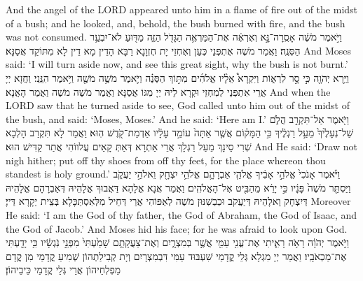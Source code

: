 {{And the angel of the LORD appeared unto him in a flame of fire out of the midst of a bush; and he looked, and, behold, the bush burned with fire, and the bush was not consumed.}{}
{וַיֹּ֣אמֶר מֹשֶׁ֔ה אָסֻֽרָה־נָּ֣א וְאֶרְאֶ֔ה אֶת־הַמַּרְאֶ֥ה הַגָּדֹ֖ל הַזֶּ֑ה מַדּ֖וּעַ לֹא־יִבְעַ֥ר הַסְּנֶֽה׃
}
{וַאֲמַר מֹשֶׁה אֶתְפְּנֵי כְּעַן וְאֶחְזֵי יָת חֶזְוָנָא רַבָּא הָדֵין מָא דֵין לָא מִתּוֹקַד אֲסַנָּא׃}
{And Moses said: ‘I will turn aside now, and see this great sight, why the bush is not burnt.’}{}
{וַיַּ֥רְא יְהֹוָ֖ה כִּ֣י סָ֣ר לִרְא֑וֹת וַיִּקְרָא֩ אֵלָ֨יו אֱלֹהִ֜ים מִתּ֣וֹךְ הַסְּנֶ֗ה וַיֹּ֛אמֶר מֹשֶׁ֥ה מֹשֶׁ֖ה וַיֹּ֥אמֶר הִנֵּֽנִי׃}
{וַחֲזָא יְיָ אֲרֵי אִתְפְּנֵי לְמִחְזֵי וּקְרָא לֵיהּ יְיָ מִגּוֹ אֲסַנָּא וַאֲמַר מֹשֶׁה מֹשֶׁה וַאֲמַר הָאֲנָא׃}
{And when the LORD saw that he turned aside to see, God called unto him out of the midst of the bush, and said: ‘Moses, Moses.’ And he said: ‘Here am I.’}{}
{וַיֹּ֖אמֶר אַל־תִּקְרַ֣ב הֲלֹ֑ם שַׁל־נְעָלֶ֙יךָ֙ מֵעַ֣ל רַגְלֶ֔יךָ כִּ֣י הַמָּק֗וֹם אֲשֶׁ֤ר אַתָּה֙ עוֹמֵ֣ד עָלָ֔יו אַדְמַת־קֹ֖דֶשׁ הֽוּא׃
}
{וַאֲמַר לָא תִּקְרַב הָלְכָא שְׁרִי סֵינָךְ מֵעַל רַגְלָךְ אֲרֵי אַתְרָא דְּאַתְּ קָאֵים עֲלווֹהִי אֲתַר קַדִּישׁ הוּא׃}
{And He said: ‘Draw not nigh hither; put off thy shoes from off thy feet, for the place whereon thou standest is holy ground.’}{}
{וַיֹּ֗אמֶר אָנֹכִי֙ אֱלֹהֵ֣י אָבִ֔יךָ אֱלֹהֵ֧י אַבְרָהָ֛ם אֱלֹהֵ֥י יִצְחָ֖ק וֵאלֹהֵ֣י יַעֲקֹ֑ב וַיַּסְתֵּ֤ר מֹשֶׁה֙ פָּנָ֔יו כִּ֣י יָרֵ֔א מֵהַבִּ֖יט אֶל־הָאֱלֹהִֽים׃}
{וַאֲמַר אֲנָא אֱלָהָא דַּאֲבוּךְ אֱלָהֵיהּ דְּאַבְרָהָם אֱלָהֵיהּ דְּיִצְחָק וֵאלָהֵיהּ דְּיַעֲקֹב וּכְבַשִׁנּוּן מֹשֶׁה לְאַפּוֹהִי אֲרֵי דְּחֵיל מִלְּאִסְתַּכָּלָא בְּצֵית יְקָרָא דַּייָ׃}
{Moreover He said: ‘I am the God of thy father, the God of Abraham, the God of Isaac, and the God of Jacob.’ And Moses hid his face; for he was afraid to look upon God.}{}
{וַיֹּ֣אמֶר יְהֹוָ֔ה רָאֹ֥ה רָאִ֛יתִי אֶת־עֳנִ֥י עַמִּ֖י אֲשֶׁ֣ר בְּמִצְרָ֑יִם וְאֶת־צַעֲקָתָ֤ם שָׁמַ֙עְתִּי֙ מִפְּנֵ֣י נֹֽגְשָׂ֔יו כִּ֥י יָדַ֖עְתִּי אֶת־מַכְאֹבָֽיו׃
}
{וַאֲמַר יְיָ מִגְלָא גְּלֵי קֳדָמַי שִׁעְבּוּד עַמִּי דִּבְמִצְרָיִם וְיָת קְבִילַתְהוֹן שְׁמִיעַ קֳדָמַי מִן קֳדָם מַפְלְחֵיהוֹן אֲרֵי גְּלֵי קֳדָמַי כֵּיבֵיהוֹן׃}
}

